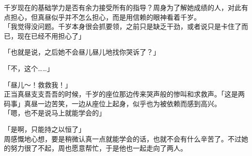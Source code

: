 千岁现在的基础学力是否有余力接受所有的指导？周身为了解她成绩的人，对此有点担心，但真昼似乎并不怎么担心，而是用信赖的眼神看着千岁。\\

「我觉得没问题。千岁本身很会抓要领，之前只是缺乏干劲，或者说只是卡住了而已，现在已经不用担心了」

「也就是说，之后她不会昼儿昼儿地找你哭诉了？」

「不，这个……」

「昼儿～！救救我！」\\

正当真昼支支吾吾的时候，千岁的座位那边传来哭声般的惨叫和求救声。「这是两码事」真昼一边苦笑，一边从座位上起身，似乎也为被依赖而感到高兴。\\

「嗯，也不是说马上就能学会的」

「是啊，只能持之以恒了」\\

周感慨地心想，要是稍微认真一点就能学会的话，也就不会有什么辛苦了。不过她的努力很了不起，周也愿意帮忙，于是他也一起走向了两人。
